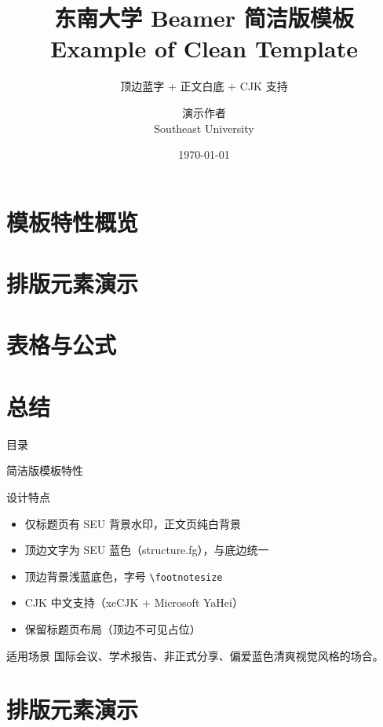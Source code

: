 \documentclass[aspectratio=169, 11pt]{beamer}
\title[简洁版模板示例]{东南大学 Beamer 简洁版模板 \\ Example of Clean Template}
\subtitle{顶边蓝字 + 正文白底 + CJK 支持}
\author[演示作者]{演示作者 \\ Southeast University}
\date{\today}
\begin{document}
\begin{frame}
\titlepage
\end{frame}

\section{模板特性概览}
\section{排版元素演示}
\section{表格与公式}
\section{总结}

\plainframetitle
\begin{frame}{目\quad 录}
\tableofcontents
\end{frame}

\begin{frame}{简洁版模板特性}
\begin{block}{设计特点}
  \begin{itemize}
    \item 仅标题页有 SEU 背景水印，正文页纯白背景
    \item 顶边文字为 SEU 蓝色（\textcolor{structure.fg}{structure.fg}），与底边统一
    \item 顶边背景浅蓝底色，字号 \texttt{\textbackslash footnotesize}
    \item CJK 中文支持（xeCJK + Microsoft YaHei）
    \item 保留标题页布局（顶边不可见占位）
  \end{itemize}
\end{block}

\begin{exampleblock}{适用场景}
   国际会议、学术报告、非正式分享、偏爱蓝色清爽视觉风格的场合。
\end{exampleblock}
\end{frame}

\section{排版元素演示}
\end{document}
